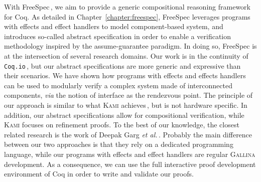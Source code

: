 With FreeSpec\,\cite{letan2018freespeccode}, we aim to provide a generic
compositional reasoning framework for Coq.
%
As detailed in Chapter~\ref{chapter:freespec}, FreeSpec leverages programs with
effects and effect handlers to model component-based system, and introduces
so-called abstract specification in order to enable a verification methodology
inspired by the assume-guarantee paradigm.
%
In doing so, FreeSpec is at the intersection of several research domains.
%
Our work is in the continuity of \texttt{Coq.io}\,\cite{claret2015coqio}, but
our abstract specifications are more generic and expressive than their
scenarios.
%
We have shown how programs with effects and effects handlers can be used to
modularly verify a complex system made of interconnected components, \emph{via}
the notion of interface as the rendezvous point.
%
The principle of our approach is similar to what {\scshape Kami}
achieves\,\cite{choi2017kami}, but is not hardware specific.
%
In addition, our abstract specifications allow for compositional verification,
while {\scshape Kami} focuses on refinement proofs.
%
To the best of our knowledge, the closest related research is the work of Deepak
Garg \emph{et al.}\,\cite{garg2010compositional}.
%
Probably the main difference between our two approaches is that they rely on a
dedicated programming language, while our programs with effects and effect
handlers are regular {\scshape Gallina} development.
%
As a consequence, we can use the full interactive proof development environment
of Coq in order to write and validate our proofs.
